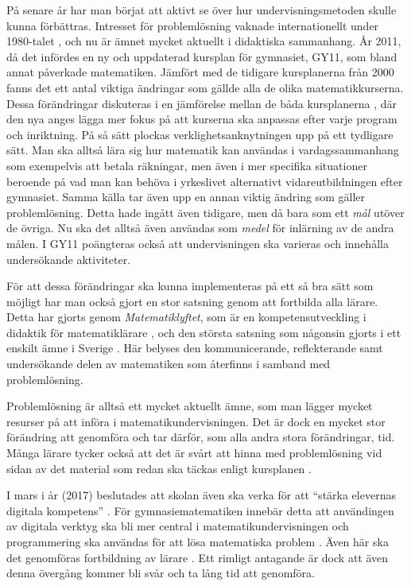 \textcolor{lila}{På senare år har man börjat att aktivt se över hur undervisningsmetoden skulle kunna förbättras. Intresset för problemlösning vaknade internationellt under 1980-talet \cite{80-talet}, och nu är ämnet mycket aktuellt i didaktiska sammanhang. År 2011, då det infördes en ny och uppdaterad kursplan för gymnasiet, GY11, som bland annat påverkade matematiken. Jämfört med de tidigare kursplanerna från 2000 fanns det ett antal viktiga ändringar som gällde alla de olika matematikkurserna. 
Dessa förändringar diskuteras i en jämförelse mellan de båda kursplanerna \cite{GY00-GY11}, där den nya anges lägga mer fokus på att kurserna ska anpassas efter varje program och inriktning. På så sätt plockas verklighetsanknytningen upp på ett tydligare sätt. Man ska alltså lära sig hur matematik kan användas i vardagssammanhang som exempelvis att betala räkningar, men även i mer specifika situationer beroende på vad man kan behöva i yrkeslivet alternativt vidareutbildningen efter gymnasiet. 
Samma källa tar även upp en annan viktig ändring som gäller problemlösning. Detta hade ingått även tidigare, men då bara som ett \textsl{mål} utöver de övriga. Nu ska det alltså även användas som \textsl{medel} för inlärning av de andra målen. I GY11 poängteras också att undervisningen ska varieras och innehålla undersökande aktiviteter.}

\textcolor{lila}{För att dessa förändringar ska kunna implementeras på ett så bra sätt som möjligt har man också gjort en stor satsning genom att fortbilda alla lärare. Detta har gjorts genom \textsl{Matematiklyftet}, som är en kompetensutveckling i didaktik för matematiklärare \cite{Namnaren}, och den största satsning som någonsin gjorts i ett enskilt ämne i Sverige \cite{mattelyftet}. Här belyses den kommunicerande, reflekterande samt undersökande delen av matematiken som återfinns i samband med problemlösning.}
            
\textcolor{lila}{Problemlösning är alltså ett mycket aktuellt ämne, som man lägger mycket resurser på att införa i matematikundervisningen. Det är dock en mycket stor förändring att genomföra och tar därför, som alla andra stora förändringar, tid. Många lärare tycker också att det är svårt att hinna med problemlösning vid sidan av det material som redan ska täckas enligt kursplanen \cite{2016Senare}.}


\textcolor{lila}{I mars i år (2017) beslutades att skolan även ska verka för att ``stärka elevernas digitala kompetens'' \cite{regeringen}. För gymnasiematematiken innebär detta att användingen av digitala verktyg ska bli mer central i matematikundervisningen och programmering ska användas för att lösa matematiska problem \cite{itiskolan}. Även här ska det genomföras fortbildning av lärare \cite{prog_utbildning}. Ett rimligt antagande är dock att även denna övergång kommer bli svår och ta lång tid att genomföra.}